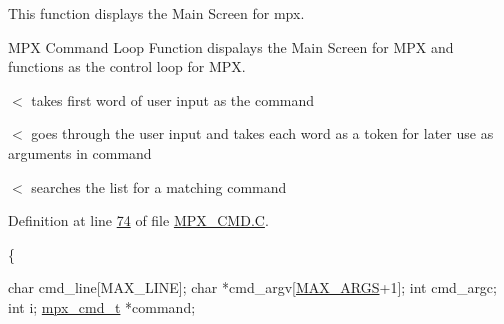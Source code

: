 This function displays the Main Screen for mpx. 

MPX Command Loop Function dispalays the Main Screen for MPX and functions as the control loop for MPX. 

$<$ takes first word of user input as the command

$<$ goes through the user input and takes each word as a token for later use as arguments in command

$<$ searches the list for a matching command 



Definition at line \hyperlink{_m_p_x___c_m_d_8_c_source_l00074}{74} of file \hyperlink{_m_p_x___c_m_d_8_c_source}{MPX\_\-CMD.C}.




\begin{DoxyCode}
                            \{

        \textcolor{keywordtype}{char} cmd\_line[MAX\_LINE];
        \textcolor{keywordtype}{char} *cmd\_argv[\hyperlink{mpx__cmd_8h_a29b7451465deac204c5f7cb1f9c6e1fc}{MAX_ARGS}+1];
        \textcolor{keywordtype}{int}  cmd\_argc;
        \textcolor{keywordtype}{int}  i;
        \hyperlink{structmpx__cmd}{mpx_cmd_t} *command;


\end{DoxyCode}
